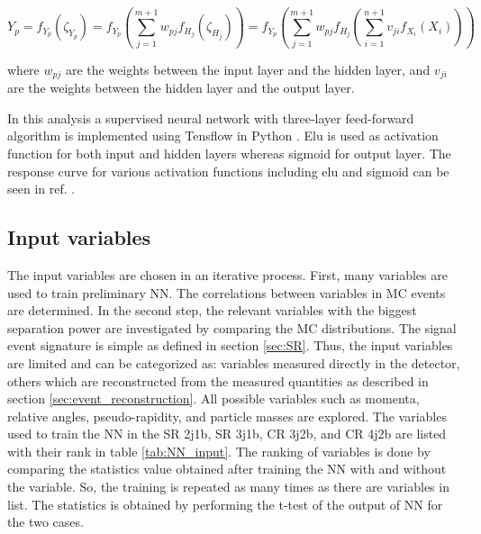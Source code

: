 \begin{equation}
    \label{eqn:NNout}
     Y_{p} = f_{Y_{p}}(\zeta_{Y_{p}}) = f_{Y_{p}}\left( \sum_{j=1}^{m+1} w_{pj}f_{H_{j}}(\zeta_{H_{j}}) \right) = f_{Y_{p}}\left( \sum_{j=1}^{m+1} w_{pj}f_{H_{j}}\left( \sum_{i=1}^{n+1} v_{ji}f_{X_{i}}(X_{i}) \right) \right)
\end{equation}

where $w_{pj}$ are the weights between the input layer and the hidden layer, and $v_{ji}$ are the weights between the hidden layer and the output layer.

In this analysis a supervised neural network with three-layer feed-forward algorithm is implemented using Tensflow in Python \cite{tensorflow_developers_2021_5799851}.  Elu is used as activation function for both input and hidden layers whereas sigmoid for output layer. The response curve for various activation functions including elu and sigmoid can be seen in ref. \cite{nwankpa2018activation}.



\subsection{Input variables}
The input variables are chosen in an iterative process. First, many variables are used to train preliminary NN. The correlations between variables in MC events are determined. In the second step, the relevant variables with the biggest separation power are investigated by comparing the MC distributions. The signal event signature is simple as defined in section \ref{sec:SR}. Thus, the input variables are limited and can be categorized as: variables measured directly in the detector, others which are reconstructed from the measured quantities as described in section \ref{sec:event_reconstruction}. All possible variables such as momenta, relative angles, pseudo-rapidity, and particle masses are explored. The  variables used to train the NN in the SR 2j1b, SR 3j1b, CR 3j2b, and CR 4j2b are listed with their rank in table \ref{tab:NN_input}. The ranking of variables is done by comparing the statistics value obtained after training the NN with and without the variable. So, the training is repeated as many times as there are variables in list. The statistics is obtained by performing the t-test of the output of NN for the two cases. 


